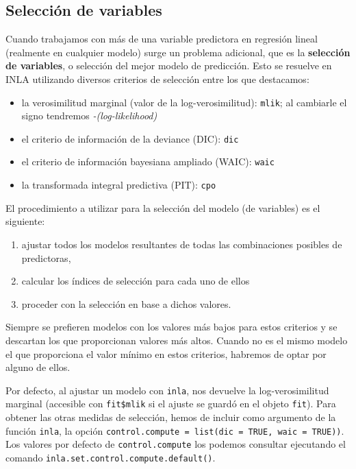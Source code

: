 \documentclass[
]{book}
\providecommand{\tightlist}{%
  \setlength{\itemsep}{0pt}\setlength{\parskip}{0pt}}
\begin{document}
\hypertarget{selecciuxf3n-de-variables}{%
\subsection{Selección de variables}\label{selecciuxf3n-de-variables}}

Cuando trabajamos con más de una variable predictora en regresión lineal (realmente en cualquier modelo) surge un problema adicional, que es la \textbf{selección de variables}, o selección del mejor modelo de predicción. Esto se resuelve en INLA utilizando diversos criterios de selección entre los que destacamos:

\begin{itemize}
\tightlist
\item
  la verosimilitud marginal (valor de la log-verosimilitud): \texttt{mlik}; al cambiarle el signo tendremos \emph{-(log-likelihood)}
\item
  el criterio de información de la deviance (DIC): \texttt{dic}
\item
  el criterio de información bayesiana ampliado (WAIC): \texttt{waic}
\item
  la transformada integral predictiva (PIT): \texttt{cpo}
\end{itemize}

El procedimiento a utilizar para la selección del modelo (de variables) es el siguiente:

\begin{enumerate}
\def\labelenumi{\arabic{enumi}.}
\tightlist
\item
  ajustar todos los modelos resultantes de todas las combinaciones posibles de predictoras,
\item
  calcular los índices de selección para cada uno de ellos
\item
  proceder con la selección en base a dichos valores.
\end{enumerate}

Siempre se prefieren modelos con los valores más bajos para estos criterios y se descartan los que proporcionan valores más altos. Cuando no es el mismo modelo el que proporciona el valor mínimo en estos criterios, habremos de optar por alguno de ellos.

Por defecto, al ajustar un modelo con \texttt{inla}, nos devuelve la log-verosimilitud marginal (accesible con \texttt{fit\$mlik} si el ajuste se guardó en el objeto \texttt{fit}). Para obtener las otras medidas de selección, hemos de incluir como argumento de la función \texttt{inla}, la opción \texttt{control.compute\ =\ list(dic\ =\ TRUE,\ waic\ =\ TRUE))}. Los valores por defecto de \texttt{control.compute} los podemos consultar ejecutando el comando \texttt{inla.set.control.compute.default()}.
\end{document}
